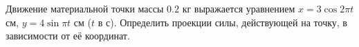 Движение материальной точки массы $0.2$ кг выражается уравнением
$x = 3\cos{2\pi t}$ см, $y = 4\sin{\pi t}$ см ($t$ в с).
Определить проекции силы, действующей на точку,
в зависимости от её координат.
